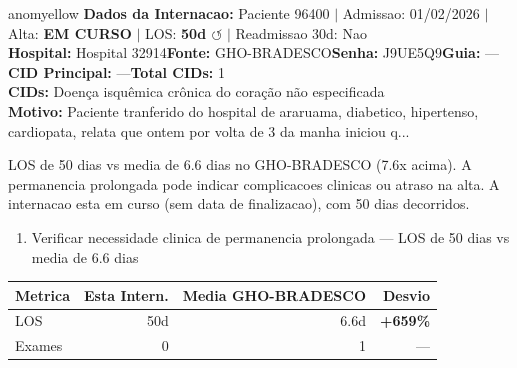 \documentclass[a4paper,10pt]{article}
\begin{document}
\begin{anomalycard}[Internacao 116007 | GHO-BRADESCO | MODERADO (z=2.94)]{anomyellow}
\textbf{Dados da Internacao:} Paciente 96400 $\mid$ Admissao: 01/02/2026 $\mid$ Alta: \textcolor{anomorange}{\textbf{EM CURSO}} $\mid$ LOS: \textbf{50d \textcolor{anomorange}{$\circlearrowleft$}} $\mid$ Readmissao 30d: Nao\\
\textbf{Hospital:} Hospital 32914\quad\textbf{Fonte:} GHO-BRADESCO\quad\textbf{Senha:} J9UE5Q9\quad\textbf{Guia:} ---\\
\textbf{CID Principal:} {\small ---}\quad\textbf{Total CIDs:} 1\\

\textbf{CIDs:} {\scriptsize Doença isquêmica crônica do coração não especificada}\\

\textbf{Motivo:} {\scriptsize Paciente tranferido do hospital de araruama, diabetico, hipertenso, cardiopata, relata que ontem por volta de 3 da manha iniciou q...}\\

\vspace{2pt}\begin{tcolorbox}[colback=severityred!20,colframe=anomyellow,title={\textbf{Interpretacao de Negocio}},fonttitle=\bfseries\small,left=4pt,right=4pt,top=3pt,bottom=3pt]
{\small LOS de 50 dias vs media de 6.6 dias no GHO-BRADESCO (7.6x acima). A permanencia prolongada pode indicar complicacoes clinicas ou atraso na alta. A internacao esta em curso (sem data de finalizacao), com 50 dias decorridos.}
\end{tcolorbox}
\begin{tcolorbox}[colback=severityyellow!30,colframe=anomorange,title={\textbf{Recomendacoes Especificas}},fonttitle=\bfseries\small,left=4pt,right=4pt,top=3pt,bottom=3pt]
\begin{enumerate}[nosep,leftmargin=16pt]
\item {\small Verificar necessidade clinica de permanencia prolongada --- LOS de 50 dias vs media de 6.6 dias}
\end{enumerate}
\end{tcolorbox}
\begin{center}\begin{tabular}{l r r r}\toprule\textbf{Metrica} & \textbf{Esta Intern.} & \textbf{Media GHO-BRADESCO} & \textbf{Desvio} \\\midrule
LOS & 50d & 6.6d & \textcolor{anomred}{\textbf{+659\%}} \\
Exames & 0 & 1 & --- \\
\bottomrule\end{tabular}\end{center}


\end{anomalycard}
\end{document}
